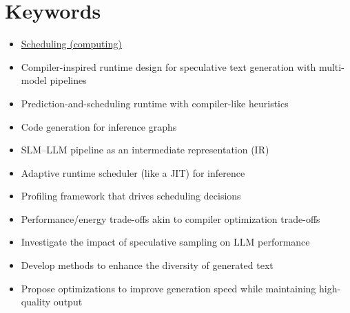 \documentclass[draft,a4paper,12pt]{report}
\begin{document}
\section*{Keywords}
\begin{itemize}
    \item \href{https://en.wikipedia.org/wiki/Scheduling_(computing)}{Scheduling (computing)}
    \item Compiler-inspired runtime design for speculative text generation with multi-model pipelines
    \item Prediction-and-scheduling runtime with compiler-like heuristics
    \item Code generation for inference graphs
    \item SLM–LLM pipeline as an intermediate representation (IR)
    \item Adaptive runtime scheduler (like a JIT) for inference
    \item Profiling framework that drives scheduling decisions
    \item Performance/energy trade-offs akin to compiler optimization trade-offs
    \item Investigate the impact of speculative sampling on LLM performance
    \item Develop methods to enhance the diversity of generated text
    \item Propose optimizations to improve generation speed while maintaining high-quality output
\end{itemize}
\end{document}
